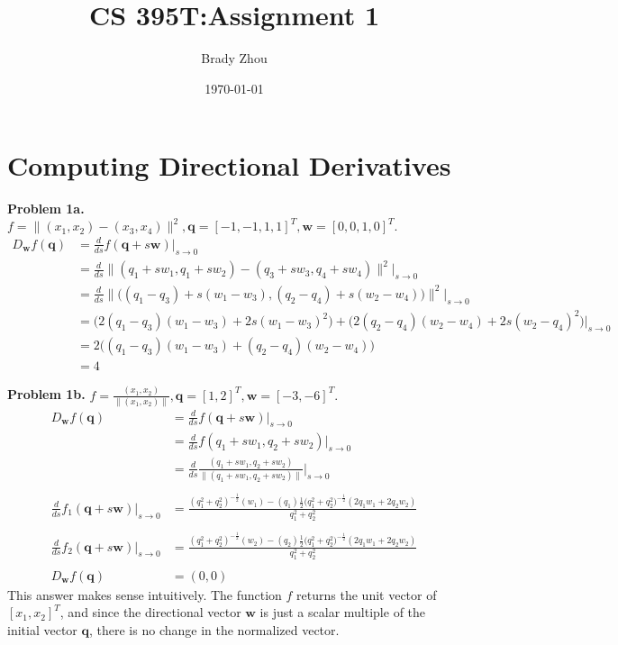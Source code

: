 \documentclass[11pt]{article}
\title{\textbf{CS 395T:\@ Assignment 1}}
\author{Brady Zhou}
\date{\today}
\newcommand{\bq}{\mathbf{q}}
\newcommand{\bw}{\mathbf{w}}
\begin{document}

\maketitle

\section{Computing Directional Derivatives}

\noindent \textbf{Problem 1a.}
$f = \|(x_1,x_2) - (x_3,x_4)\|^2, \bq = [-1, -1, 1, 1]^T, \bw = [0, 0, 1, 0]^T.$
\begin{align*}
D_{\bw} f(\bq)
    &= \frac{d}{ds} f(\bq + s \bw) \big|_{s \to 0} \\
    &= \frac{d}{ds} \|(q_1 + s w_1, q_1 + s w_2) - (q_3 + s w_3, q_4 + s w_4)\|^2 \big|_{s \to 0} \\
    &= \frac{d}{ds} \|\big((q_1 - q_3) + s (w_1 - w_3), (q_2 - q_4) + s (w_2 - w_4)\big)\|^2 \big|_{s \to 0} \\
    &= \big(2 (q_1 - q_3) (w_1 - w_3) + 2 s (w_1 - w_3)^2 \big) + \big(2 (q_2 - q_4) (w_2 - w_4) + 2 s (w_2 - q_4)^2 \big) \big|_{s \to 0} \\
    &= 2 \big((q_1 - q_3) (w_1 - w_3) + (q_2 - q_4) (w_2 - w_4) \big) \\
    &= 4
\end{align*}

\noindent \textbf{Problem 1b.}
$f = \frac{(x_1, x_2)}{\|(x_1, x_2)\|}, \bq = [1, 2]^T, \bw = [-3, -6]^T.$
\begin{align*}
D_{\bw} f(\bq)
    &= \frac{d}{ds} f(\bq + s \bw) \big|_{s \to 0} \\
    &= \frac{d}{ds} f(q_1 + s w_1, q_2 + s w_2) \big |_{s \to 0} \\
    &= \frac{d}{ds} \frac{(q_1 + s w_1, q_2 + s w_2)}{\|(q_1 + s w_1, q_2 + s w_2)\|} \big |_{s \to 0} \\
    \\
\frac{d}{ds} f_1 (\bq + s \bw) \big|_{s \to 0}
    &= \frac{(q_1^2 + q_2^2 )^{-\frac{1}{2}} (w_1) - (q_1) \frac{1}{2} \big(q_1^2 + q_2^2 \big)^{-\frac{1}{2}} (2 q_1 w_1 + 2 q_2 w_2)}{q_1^2 + q_2^2} \\
    \\
\frac{d}{ds} f_2 (\bq + s \bw) \big|_{s \to 0}
    &= \frac{(q_1^2 + q_2^2 )^{-\frac{1}{2}} (w_2) - (q_2) \frac{1}{2} \big(q_1^2 + q_2^2 \big)^{-\frac{1}{2}} (2 q_1 w_1 + 2 q_2 w_2)}{q_1^2 + q_2^2} \\
    \\
D_{\bw} f(\bq)
    &= (0, 0)
\end{align*}
This answer makes sense intuitively. The function $f$ returns the unit vector of $[x_1, x_2]^T$, and since the directional vector $\bw$ is just a scalar multiple of the initial vector $\bq$, there is no change in the normalized vector.
\end{document}

